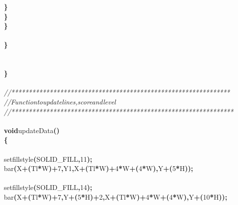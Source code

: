 \documentclass[a4paper, 10pt]{article}
\newcommand\SPC{\hspace*{0.6em}}
\newcommand\HYP{\mbox{\char 45}}
\newcommand{\CppAComment}[1]{\textit{\textcolor[rgb]{0.2,0.6,1}{#1}}}
\newcommand{\CppAIdentifier}[1]{#1}
\newcommand{\CppANumber}[1]{\textcolor[rgb]{0.5,0,0.5}{#1}}
\newcommand{\CppAReservedWord}[1]{\textbf{#1}}
\newcommand{\CppASpace}[1]{\colorbox[rgb]{1,1,1}{#1}}
\newcommand{\CppASymbol}[1]{\textbf{\textcolor[rgb]{1,0,0}{#1}}}
\begin{document}
\begin{ttfamily}
\CppASpace{\SPC \SPC \SPC \SPC }\CppASymbol{\}}\\
\CppASpace{\SPC \SPC \SPC }\CppASymbol{\}}\\
\CppASpace{\SPC \SPC \SPC }\CppASymbol{\}}\\
\\
\CppASpace{\SPC }\CppASymbol{\}}\\
\\
\\
\CppASymbol{\}}\\
\\
\CppAComment{//***************************************************************}\\
\CppAComment{//\SPC \SPC \SPC Function\SPC to\SPC update\SPC lines,\SPC score\SPC and\SPC level}\\
\CppAComment{//****************************************************************}\\
\\
\CppAReservedWord{void}\CppASpace{\SPC }\CppAIdentifier{updateData}\CppASymbol{(}\CppASymbol{)}\\
\CppASymbol{\{}\\
\\
\CppASpace{\SPC \SPC \SPC \SPC \SPC \SPC \SPC }\CppAIdentifier{setfillstyle}\CppASymbol{(}\CppAIdentifier{SOLID\_FILL}\CppASymbol{,}\CppANumber{11}\CppASymbol{)}\CppASymbol{;}\\
\CppASpace{\SPC \SPC \SPC \SPC \SPC \SPC \SPC }\CppAIdentifier{bar}\CppASymbol{(}\CppAIdentifier{X}\CppASymbol{+}\CppASymbol{(}\CppAIdentifier{Tl}\CppASymbol{*}\CppAIdentifier{W}\CppASymbol{)}\CppASymbol{+}\CppANumber{7}\CppASymbol{,}\CppAIdentifier{Y}\CppASymbol{\HYP }\CppANumber{1}\CppASymbol{,}\CppAIdentifier{X}\CppASymbol{+}\CppASymbol{(}\CppAIdentifier{Tl}\CppASymbol{*}\CppAIdentifier{W}\CppASymbol{)}\CppASymbol{+}\CppANumber{4}\CppASymbol{*}\CppAIdentifier{W}\CppASymbol{+}\CppASymbol{(}\CppANumber{4}\CppASymbol{*}\CppAIdentifier{W}\CppASymbol{)}\CppASymbol{,}\CppAIdentifier{Y}\CppASymbol{+}\CppASymbol{(}\CppANumber{5}\CppASymbol{*}\CppAIdentifier{H}\CppASymbol{)}\CppASymbol{)}\CppASymbol{;}\\
\\
\CppASpace{\SPC \SPC \SPC \SPC \SPC \SPC \SPC }\CppAIdentifier{setfillstyle}\CppASymbol{(}\CppAIdentifier{SOLID\_FILL}\CppASymbol{,}\CppANumber{14}\CppASymbol{)}\CppASymbol{;}\\
\CppASpace{\SPC \SPC \SPC \SPC \SPC \SPC \SPC }\CppAIdentifier{bar}\CppASymbol{(}\CppAIdentifier{X}\CppASymbol{+}\CppASymbol{(}\CppAIdentifier{Tl}\CppASymbol{*}\CppAIdentifier{W}\CppASymbol{)}\CppASymbol{+}\CppANumber{7}\CppASymbol{,}\CppAIdentifier{Y}\CppASymbol{+}\CppASymbol{(}\CppANumber{5}\CppASymbol{*}\CppAIdentifier{H}\CppASymbol{)}\CppASymbol{+}\CppANumber{2}\CppASymbol{,}\CppAIdentifier{X}\CppASymbol{+}\CppASymbol{(}\CppAIdentifier{Tl}\CppASymbol{*}\CppAIdentifier{W}\CppASymbol{)}\CppASymbol{+}\CppANumber{4}\CppASymbol{*}\CppAIdentifier{W}\CppASymbol{+}\CppASymbol{(}\CppANumber{4}\CppASymbol{*}\CppAIdentifier{W}\CppASymbol{)}\CppASymbol{,}\CppAIdentifier{Y}\CppASymbol{+}\CppASymbol{(}\CppANumber{10}\CppASymbol{*}\CppAIdentifier{H}\CppASymbol{)}\CppASymbol{)}\CppASymbol{;}\\

\end{ttfamily}
\end{document}
